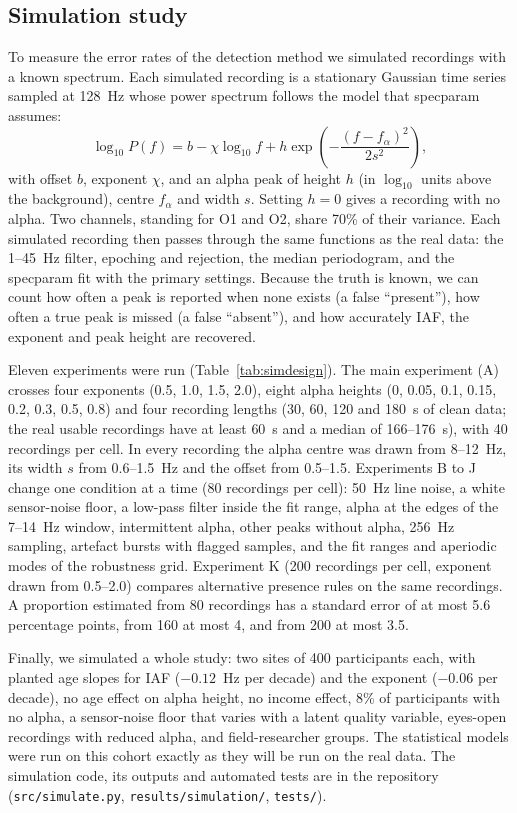 \documentclass[11pt,a4paper]{article}
\begin{document}
\subsection{Simulation study}
\label{sec:simmethods}

To measure the error rates of the detection method we simulated recordings with a known
spectrum. Each simulated recording is a stationary Gaussian time series sampled at 128~Hz
whose power spectrum follows the model that specparam assumes:
\begin{equation}
\log_{10} P(f) = b - \chi \log_{10} f + h \exp\!\left(-\frac{(f - f_\alpha)^2}{2 s^2}\right),
\end{equation}
with offset $b$, exponent $\chi$, and an alpha peak of height $h$ (in $\log_{10}$ units
above the background), centre $f_\alpha$ and width $s$. Setting $h = 0$ gives a recording
with no alpha. Two channels, standing for O1 and O2, share 70\% of their variance. Each
simulated recording then passes through the same functions as the real data: the 1--45~Hz
filter, epoching and rejection, the median periodogram, and the specparam fit with the
primary settings. Because the truth is known, we can count how often a peak is reported
when none exists (a false ``present''), how often a true peak is missed (a false
``absent''), and how accurately IAF, the exponent and peak height are recovered.

Eleven experiments were run (Table~\ref{tab:simdesign}). The main experiment (A) crosses
four exponents (0.5, 1.0, 1.5, 2.0), eight alpha heights (0, 0.05, 0.1, 0.15, 0.2, 0.3,
0.5, 0.8) and four recording lengths (30, 60, 120 and 180~s of clean data; the real usable
recordings have at least 60~s and a median of 166--176~s), with 40 recordings per cell. In
every recording the alpha centre was drawn from 8--12~Hz, its width $s$ from 0.6--1.5~Hz
and the offset from 0.5--1.5. Experiments B to J change one condition at a time (80
recordings per cell): 50~Hz line noise, a white sensor-noise floor, a low-pass filter
inside the fit range, alpha at the edges of the 7--14~Hz window, intermittent alpha, other
peaks without alpha, 256~Hz sampling, artefact bursts with flagged samples, and the fit
ranges and aperiodic modes of the robustness grid. Experiment K (200 recordings per cell,
exponent drawn from 0.5--2.0) compares alternative presence rules on the same recordings.
A proportion estimated from 80 recordings has a standard error of at most 5.6 percentage
points, from 160 at most 4, and from 200 at most 3.5.

Finally, we simulated a whole study: two sites of 400 participants each, with planted age
slopes for IAF ($-0.12$~Hz per decade) and the exponent ($-0.06$ per decade), no age effect
on alpha height, no income effect, 8\% of participants with no alpha, a sensor-noise floor
that varies with a latent quality variable, eyes-open recordings with reduced alpha, and
field-researcher groups. The statistical models were run on this cohort exactly as they
will be run on the real data. The simulation code, its outputs and automated tests are in
the repository (\texttt{src/simulate.py}, \texttt{results/simulation/},
\texttt{tests/}).
\end{document}

